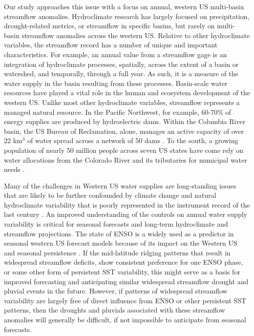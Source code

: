 \documentclass[final, double]{ua-thesis}
\begin{document}
Our study approaches this issue with a focus on annual, western US multi-basin streamflow anomalies. Hydroclimate research has largely focused on precipitation, drought-related metrics, or streamflow in specific basins, but rarely on multi-basin streamflow anomalies across the western US. Relative to other hydroclimate variables, the streamflow record has a number of unique and important characteristics. For example, an annual value from a streamflow gage is an integration of hydroclimate processes, spatially, across the extent of a basin or watershed, and temporally, through a full year. As such, it is a measure of the water supply in the basin resulting from these processes. Basin-scale water resources have played a vital role in the human and ecosystem development of the western US. Unlike most other hydroclimate variables, streamflow represents a managed natural resource. In the Pacific Northwest, for example, 60-70\% of energy supplies are produced by hydroelectric dams. Within the Columbia River basin, the US Bureau of Reclamation, alone, manages an active capacity of over 22 km$^3$ of water spread across a network of 50 dams \citep{1reclamation_bureau_of_reclamation_secure_2016}. To the south, a growing population of nearly 50 million people across seven US states have come rely on water allocations from the Colorado River and its tributaries for municipal water needs \citep{1reclamation_bureau_of_reclamation_secure_2016}.

Many of the challenges in Western US water supplies are long-standing issues that are likely to be further confounded by climate change and natural hydroclimate variability that is poorly represented in the instrument record of the last century \citep{1meko_dendrochronology_2012, 1dettinger_western_2015}. An improved understanding of the controls on annual water supply variability is critical for seasonal forecasts and long-term hydroclimate and streamflow projections. The state of ENSO is a widely used as a predictor in seasonal western US forecast models because of its impact on the Western US and seasonal persistence \citep{1liu_atmospheric_2007}. If the mid-latitude ridging patterns that result in widespread streamflow deficits, show consistent preference for one ENSO phase, or some other form of persistent SST variability, this might serve as a basis for improved forecasting and anticipating similar widespread streamflow drought and pluvial events in the future. However, if patterns of widespread streamflow variability are largely free of direct influence from ENSO or other persistent SST patterns, then the droughts and pluvials associated with these streamflow anomalies will generally be difficult, if not impossible to anticipate from seasonal forecasts.
\end{document}
